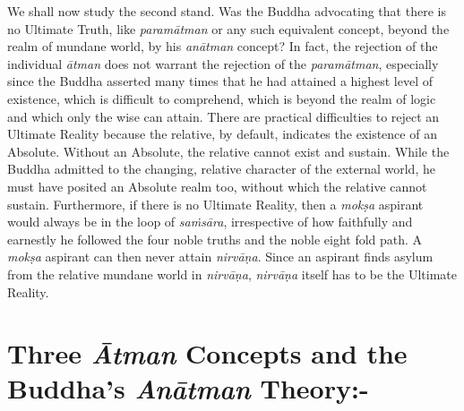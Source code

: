 We shall now study the second stand. Was the Buddha advocating that there is no Ultimate Truth, like \textit{paramātman} or any such equivalent concept, beyond the realm of mundane world, by his \textit{anātman} concept? In fact, the rejection of the individual \textit{ātman} does not warrant the rejection of the \textit{paramātman}, especially since the Buddha asserted many times that he had attained a highest level of existence, which is difficult to comprehend, which is beyond the realm of logic and which only the wise can attain. There are practical difficulties to reject an Ultimate Reality because the relative, by default, indicates the existence of an Absolute. Without an Absolute, the relative cannot exist and sustain. While the Buddha admitted to the changing, relative character of the external world, he must have posited an Absolute realm too, without which the relative cannot sustain. Furthermore, if there is no Ultimate Reality, then a \textit{mokṣa} aspirant would always be in the loop of \textit{saṁsāra}, irrespective of how faithfully and earnestly he followed the four noble truths and the noble eight fold path. A \textit{mokṣa} aspirant can then never attain \textit{nirvāṇa}. Since an aspirant finds asylum from the relative mundane world in \textit{nirvāṇa}, \textit{nirvāṇa} itself has to be the Ultimate Reality.

\vspace{-.3cm}

\section*{Three \textit{Ātman} Concepts \hfill\break and the Buddha’s \textit{Anātman} Theory:-}

